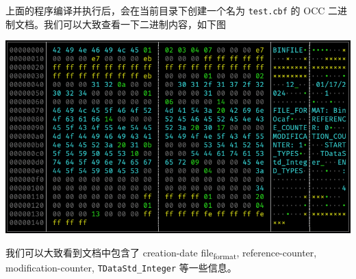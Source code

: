 \documentclass[11pt]{article}
\begin{document}
上面的程序编译并执行后，会在当前目录下创建一个名为 \texttt{test.cbf} 的 OCC 二进制文档。我们可以大致查看一下二进制内容，如下图

\begin{center}
\includegraphics[width=.9\linewidth]{./img/binocaf-binary-content.png}
\end{center}

我们可以大致看到文档中包含了 creation-date file\textsubscript{format}, reference-counter, modification-counter, \texttt{TDataStd\_Integer} 等一些信息。
\end{document}
